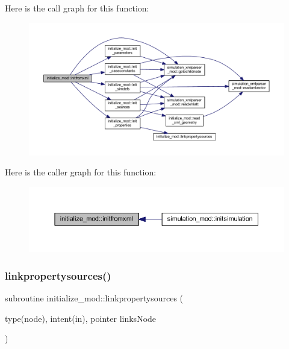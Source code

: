 Here is the call graph for this function\+:\nopagebreak
\begin{figure}[H]
\begin{center}
\leavevmode
\includegraphics[width=350pt]{namespaceinitialize__mod_a107012ffec69fe2d7c524d240193439e_cgraph}
\end{center}
\end{figure}
Here is the caller graph for this function\+:\nopagebreak
\begin{figure}[H]
\begin{center}
\leavevmode
\includegraphics[width=350pt]{namespaceinitialize__mod_a107012ffec69fe2d7c524d240193439e_icgraph}
\end{center}
\end{figure}
\mbox{\label{namespaceinitialize__mod_af38ade977df8d56db1d125bc4cc03a4a}} 
\subsubsection{\texorpdfstring{linkpropertysources()}{linkpropertysources()}}
{\footnotesize\ttfamily subroutine initialize\+\_\+mod\+::linkpropertysources (\begin{DoxyParamCaption}\item[{type(node), intent(in), pointer}]{links\+Node }\end{DoxyParamCaption})\hspace{0.3cm}{\ttfamily [private]}}



